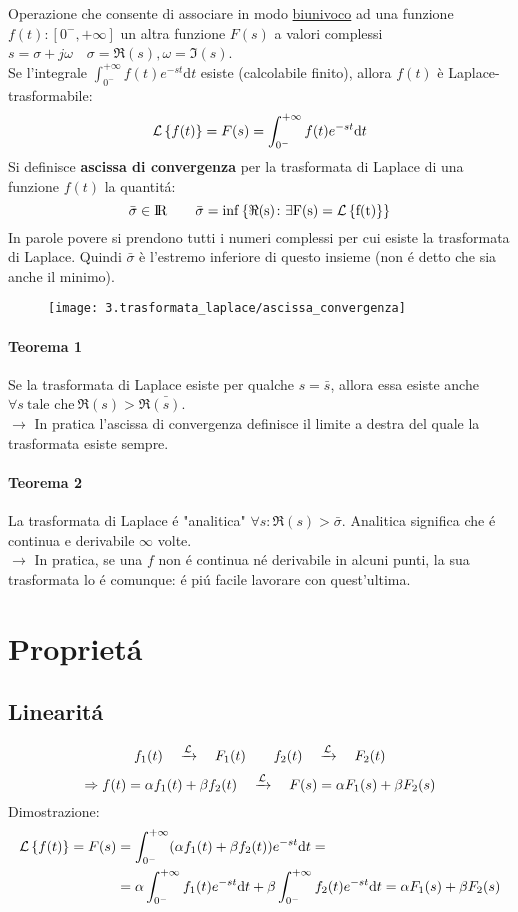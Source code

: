 \documentclass[../main.tex]{subfiles}
\begin{document}
	\label{sec:traformata_laplace}
	Operazione che consente di associare in modo \underline{biunivoco} ad una funzione $ f(t):\left[ 0^{-}, + \infty \right] $ un altra funzione $F(s)$ a valori complessi $ s = \sigma + j\omega \quad \sigma=\Re(s), \omega=\Im(s)$.\\
	\linebreak
	Se l'integrale $ \int_{0^{-}}^{+\infty}f(t)e^{-st} \mathrm{d}t $ esiste (calcolabile finito), allora $f(t)$ è Laplace-trasformabile:
	$$ \mathcal{L} \left\lbrace f(t) \right\rbrace = F(s) = \int_{0^{-}}^{+\infty} f(t) e^{- s t} \mathrm{d} t $$
	\linebreak
	Si definisce \textbf{ascissa di convergenza} per la trasformata di Laplace di una funzione $f(t)$ la quantit\'a:\\
	$$ \bar{\sigma} \in \rm I\!R \qquad \bar{\sigma} = inf\left\lbrace \Re{(s)} \colon \exists F(s) = \mathcal{L} \left\lbrace f(t) \right\rbrace \right\rbrace $$
	In parole povere si prendono tutti i numeri complessi per cui esiste la trasformata di Laplace. Quindi $ \bar{\sigma} $ è l'estremo inferiore di questo insieme (non \'e detto che sia anche il minimo).
	\begin{figure}[h!]
		\centering\texttt{[image: 3.trasformata\_laplace/ascissa\_convergenza]}
	\end{figure}
	\paragraph{Teorema 1} Se la trasformata di Laplace esiste per qualche $s=\bar{s}$, allora essa esiste anche $ \forall s\ \text{tale che}\ \Re{(s)} > \Re{\bar{(s)}} $.\\
	$\rightarrow$ In pratica l'ascissa di convergenza definisce il limite a destra del quale la trasformata esiste sempre.
	\paragraph{Teorema 2} La trasformata di Laplace \'{e} "analitica" $ \forall s \colon \Re{(s)} > \bar{\sigma}$. Analitica significa che \'e continua e derivabile $\infty$ volte.\\
	$\rightarrow$ In pratica, se una $f$ non \'e continua n\'e derivabile in alcuni punti, la sua trasformata lo \'e comunque: \'e pi\'u facile lavorare con quest'ultima.
	\section{Propriet\'{a}}
	\subsection{Linearit\'{a}}
	\label{linear}
	$$ f_{1}(t) \quad \xrightarrow{\mathcal{L}} \quad F_{1}(t) \qquad f_{2}(t) \quad \xrightarrow{\mathcal{L}} \quad F_{2}(t) $$
	$$ \Rightarrow f(t)=\alpha f_{1}(t) + \beta f_{2}(t) \quad \xrightarrow{\mathcal{L}} \quad F(s)=\alpha F_{1}(s) + \beta F_{2}(s) $$
	Dimostrazione:
	\begin{align*}
		\mathcal{L} \left\lbrace f(t) \right\rbrace = F(s) &= \int_{0^{-}}^{+\infty} (\alpha f_{1}(t) + \beta f_{2}(t)) e^{- s t} \mathrm{d} t =\\
		&= \alpha \int_{0^{-}}^{+\infty} f_{1}(t) e^{- s t} \mathrm{d} t + \beta \int_{0^{-}}^{+\infty} f_{2}(t) e^{- s t} \mathrm{d} t = \alpha F_{1}(s) + \beta F_{2}(s)
	\end{align*}
\end{document}

